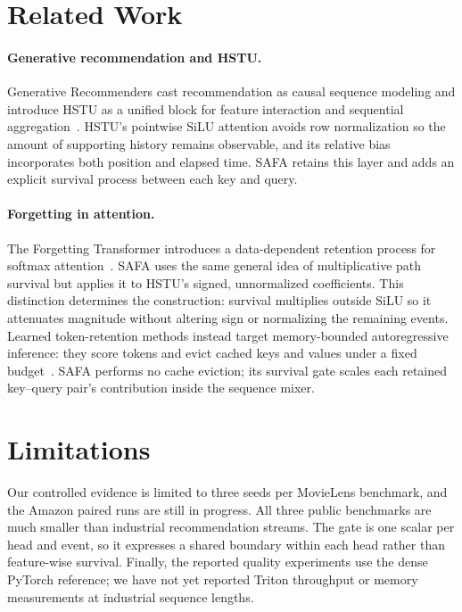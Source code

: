 \documentclass[11pt,letterpaper,logo]{yalearxiv}
\begin{document}
\section{Related Work}
\label{sec:related-work}

\paragraph{Generative recommendation and HSTU.}
Generative Recommenders cast recommendation as causal sequence modeling and
introduce HSTU as a unified block for feature interaction and sequential
aggregation~\citep{zhai2024actions}.  HSTU's pointwise SiLU attention avoids
row normalization so the amount of supporting history remains observable, and
its relative bias incorporates both position and elapsed time.  SAFA retains
this layer and adds an explicit survival process between each key and query.

\paragraph{Forgetting in attention.}
The Forgetting Transformer introduces a data-dependent retention process for
softmax attention~\citep{lin2025forgetting}.  SAFA uses the same general idea
of multiplicative path survival but applies it to HSTU's signed,
unnormalized coefficients.  This distinction determines the construction:
survival multiplies outside SiLU so it attenuates magnitude without altering
sign or normalizing the remaining events.  Learned token-retention methods
instead target memory-bounded autoregressive inference: they score tokens and
evict cached keys and values under a fixed budget~\citep{bui2026makeeach,
bui2026cachewhatlasts}.  SAFA performs no cache eviction; its survival gate scales
each retained key--query pair's contribution inside the sequence mixer.


\section{Limitations}

Our controlled evidence is limited to three seeds per MovieLens benchmark,
and the Amazon paired runs are still in progress.  All three public benchmarks
are much smaller than industrial recommendation
streams.  The gate is one scalar per head and event, so it expresses a shared
boundary within each head rather than feature-wise survival.  Finally, the
reported quality experiments use the dense PyTorch reference; we have not yet
reported Triton throughput or memory measurements at industrial sequence
lengths.
\end{document}
